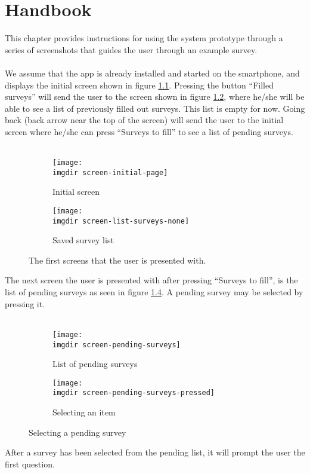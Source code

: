 \chapter{Handbook}
\label{chap:handbook}
This chapter provides instructions for using the system prototype through a series of screenshots that guides the user through an example survey.\\\\
We assume that the app is already installed and started on the smartphone, and displays the initial screen shown in figure \ref{fig:screen-initial-page}. Pressing the button ``Filled surveys'' will send the user to the screen shown in figure \ref{fig:screen-list-surveys-none}, where he/she will be able to see a list of previously filled out surveys. This list is empty for now. Going back (back arrow near the top of the screen) will send the user to the initial screen where he/she can press ``Surveys to fill'' to see a list of pending surveys.\\\\
\begin{figure}[!htbp]
 \centering

 \begin{subfigure}{.3\textwidth}
    \centering
    \texttt{[image: \\imgdir screen-initial-page]}
    \caption{Initial screen}
    \label{fig:screen-initial-page}
  \end{subfigure}
  \begin{subfigure}{.3\textwidth}
    \centering
    \texttt{[image: \\imgdir screen-list-surveys-none]}
    \caption{Saved survey list}
    \label{fig:screen-list-surveys-none}
  \end{subfigure}

  \caption{The first screens that the user is presented with.}
  \label{fig:screen-initial-pages}
\end{figure}

The next screen the user is presented with after pressing ``Surveys to fill'', is the list of pending surveys as seen in figure \ref{fig:screen-pending-surveys}. A pending survey may be selected by pressing it.\\\\

\begin{figure}[!htbp]
 \centering
 \begin{subfigure}{.3\textwidth}
  \centering
  \texttt{[image: \\imgdir screen-pending-surveys]}
  \caption{List of pending surveys}
  \label{fig:screen-pending-surveys}
\end{subfigure}
\begin{subfigure}{.3\textwidth}
  \centering
  \texttt{[image: \\imgdir screen-pending-surveys-pressed]}
  \caption{Selecting an item}
  \label{fig:screen-pending-surveys-pressed}
\end{subfigure}
\caption{Selecting a pending survey}
 \caption{}
\end{figure}
After a survey has been selected from the pending list, it will prompt the user the first question.

